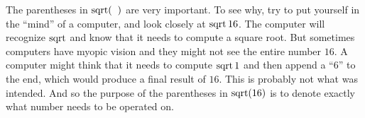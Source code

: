 %
\par  The parentheses in $\sq[(]$ are very important. To see why, try to put yourself in the
		``mind'' of a computer, and look closely at $\sq\num{16}$. The computer will recognize $\sq$
		and know that it needs to compute a square root. But sometimes computers have myopic vision and 
		they might not see the entire number $\num{16}$. A computer might think that it needs to compute 
		$\sq\num{1}$ and then append a ``6'' to the end, which would produce a final result of $\num{16}$. 
		This is probably not what was intended. And so the purpose of the parentheses in $\sq[\num{16}]$ is 
		to denote exactly what number needs to be operated on.
%
